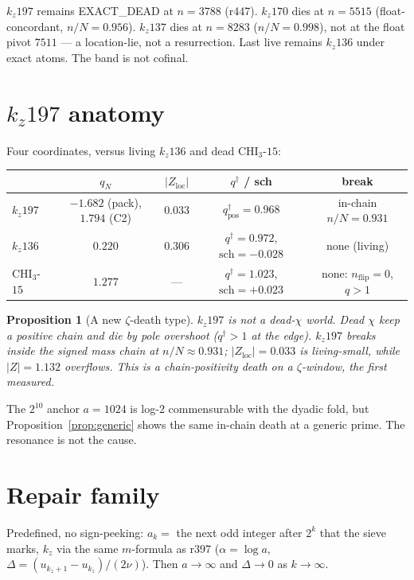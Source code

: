 \documentclass[11pt]{article}
\newtheorem{prop}{Proposition}
\begin{document}
$k_z197$ remains EXACT\_DEAD at $n=3788$
(r447).  $k_z170$ dies at $n=5515$
(float-concordant, $n/N=0.956$).
$k_z137$ dies at $n=8283$ ($n/N=0.998$),
not at the float pivot $7511$ --- a
location-lie, not a resurrection.
Last live remains $k_z136$ under exact
atoms.  The band is not cofinal.

\section{$k_z197$ anatomy}\label{sec:anat}

Four coordinates, versus living $k_z136$ and
dead CHI$_3$-$15$:

\begin{center}
\small
\begin{tabular}{lcccc}
\toprule
& $q_N$ & $\lvert Z_{\mathrm{loc}}\rvert$ & $q^{\dagger}$ / sch
& break \\
\midrule
$k_z197$ & $-1.682$ (pack), $1.794$ (C2)
& $0.033$ & $q^{\dagger}_{\mathrm{pos}}=0.968$
& in-chain $n/N=0.931$ \\
$k_z136$ & $0.220$ & $0.306$
& $q^{\dagger}=0.972$, $\mathrm{sch}=-0.028$
& none (living) \\
CHI$_3$-$15$ & $1.277$ & ---
& $q^{\dagger}=1.023$, $\mathrm{sch}=+0.023$
& none: $n_{\mathrm{flip}}=0$, $q>1$ \\
\bottomrule
\end{tabular}
\end{center}

\begin{prop}[A new $\zeta$-death type]\label{prop:zeta}
$k_z197$ is not a dead-$\chi$ world.
Dead $\chi$ keep a positive chain and die by
pole overshoot ($q^{\dagger}>1$ at the edge).
$k_z197$ breaks \emph{inside} the signed mass
chain at $n/N\approx 0.931$;
$\lvert Z_{\mathrm{loc}}\rvert=0.033$ is
\emph{living}-small, while $\lvert Z\rvert=1.132$
overflows.
This is a chain-positivity death on a
$\zeta$-window, the first measured.
\end{prop}

The $2^{10}$ anchor $a=1024$ is log-$2$
commensurable with the dyadic fold, but
Proposition~\ref{prop:generic} shows the same
in-chain death at a generic prime.
The resonance is not the cause.

\section{Repair family}\label{sec:fam}

Predefined, no sign-peeking:
$a_k=$ the next odd integer after $2^k$
that the sieve marks, $k_z$ via the same
$m$-formula as r397
($\alpha=\log a$, $\Delta=(u_{k_z+1}-u_{k_z})/(2\nu)$).
Then $a\to\infty$ and $\Delta\to 0$ as $k\to\infty$.
\end{document}
